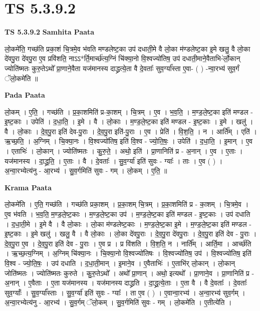 \documentclass[17pt]{extarticle}
\begin{document}
\section{ TS 5.3.9.2 }

\textbf{TS 5.3.9.2 } \newline
\textbf{Samhita Paata} \newline

लो॒कमे॑ति॒ गच्छ॑ति प्रका॒शं चि॒त्रमे॒व भ॑वति मण्डलेष्ट॒का उप॑ दधाती॒मे वै लो॒का म॑ण्डलेष्ट॒का इ॒मे खलु॒ वै लो॒का दे॑वपु॒रा दे॑वपु॒रा ए॒व प्रवि॑शति॒ नाऽऽ*र्ति॒मार्च्छ॑त्य॒ग्निं चि॑क्या॒नो वि॒श्वज्यो॑तिष॒ उप॑ दधाती॒माने॒वैताभि-॑र्लो॒कान् ज्योति॑ष्मतः कुरु॒तेऽथो᳚ प्रा॒णाने॒वैता यज॑मानस्य दाद्ध्रत्ये॒ता वै दे॒वताः᳚ सुव॒र्ग्या᳚स्ता ए॒वा- ( ) -न्वा॒रभ्य॑ सुव॒र्गं ॅलो॒कमे॑ति ॥ \newline

\textbf{Pada Paata} \newline

लो॒कम् । ए॒ति॒ । गच्छ॑ति । प्र॒का॒शमिति॑ प्र-का॒शम् । चि॒त्रम् । ए॒व । भ॒व॒ति॒ । म॒ण्ड॒ले॒ष्ट॒का इति॑ मण्डल - इ॒ष्ट॒काः । उपेति॑ । द॒धा॒ति॒ । इ॒मे । वै । लो॒काः । म॒ण्ड॒ले॒ष्ट॒का इति॑ मण्डल - इ॒ष्ट॒काः । इ॒मे । खलु॑ । वै । लो॒काः । दे॒व॒पु॒रा इति॑ देव-पु॒राः । दे॒व॒पु॒रा इति॑-पु॒राः । ए॒व । प्रेति॑ । वि॒श॒ति॒ । न । आर्ति᳚म् । एति॑ । ऋ॒च्छ॒ति॒ । अ॒ग्निम् । चि॒क्या॒नः । वि॒श्वज्यो॑तिष॒ इति॑ वि॒श्व - ज्यो॒ति॒षः॒ । उपेति॑ । द॒धा॒ति॒ । इ॒मान् । ए॒व । एताभिः॑ । लो॒कान् । ज्योति॑ष्मतः । कु॒रु॒ते॒ । अथो॒ इति॑ । प्रा॒णानिति॑ प्र - अ॒नान् । ए॒व । ए॒ताः । यज॑मानस्य । दा॒द्ध्र॒ति॒ । ए॒ताः । वै । दे॒वताः᳚ । सु॒व॒र्ग्या॑ इति॑ सुवः - ग्याः᳚ । ताः । ए॒व ( ) । अ॒न्वा॒रभ्येत्य॑नु - आ॒रभ्य॑ । सु॒व॒र्गमिति॑ सुवः - गम् । लो॒कम् । ए॒ति॒ ॥  \newline


\textbf{Krama Paata} \newline

लो॒कमे॑ति । ए॒ति॒ गच्छ॑ति । गच्छ॑ति प्रका॒शम् । प्र॒का॒शम् चि॒त्रम् । प्र॒का॒शमिति॑ प्र - का॒शम् । चि॒त्रमे॒व । ए॒व भ॑वति । भ॒व॒ति॒ म॒ण्ड॒ले॒ष्ट॒काः । म॒ण्ड॒ले॒ष्ट॒का उप॑ । म॒ण्ड॒ले॒ष्ट॒का इति॑ मण्डल - इ॒ष्ट॒काः । उप॑ दधाति । द॒धा॒ती॒मे । इ॒मे वै । वै लो॒काः । लो॒का म॑ण्डलेष्ट॒काः । म॒ण्ड॒ले॒ष्ट॒का इ॒मे । म॒ण्ड॒ले॒ष्ट॒का इति॑ मण्डल - इ॒ष्ट॒काः । इ॒मे खलु॑ । खलु॒ वै । वै लो॒काः । लो॒का दे॑वपु॒राः । दे॒व॒पु॒रा दे॑वपु॒राः । दे॒व॒पु॒रा इति॑ देव - पु॒राः । दे॒व॒पु॒रा ए॒व । दे॒व॒पु॒रा इति॑ देव - पु॒राः । ए॒व प्र । प्र वि॑शति । वि॒श॒ति॒ न । नार्ति᳚म् । आर्ति॒मा । आर्च्छ॑ति । ऋ॒च्छ॒त्य॒ग्निम् । अ॒ग्निम् चि॑क्या॒नः । चि॒क्या॒नो वि॒श्वज्यो॑तिषः । वि॒श्वज्यो॑तिष॒ उप॑ । वि॒श्वज्यो॑तिष॒ इति॑ वि॒श्व - ज्यो॒ति॒षः॒ । उप॑ दधाति । द॒धा॒ती॒मान् । इ॒माने॒व । ए॒वैताभिः॑ । ए॒ताभि॑र् लो॒कान् । लो॒कान् जोति॑ष्मतः । ज्योति॑ष्मतः कुरुते । कु॒रु॒तेऽथो᳚ । अथो᳚ प्रा॒णान् । अथो॒ इत्यथो᳚ । प्रा॒णाने॒व । प्रा॒णानिति॑ प्र - अ॒नान् । ए॒वैताः । ए॒ता यज॑मानस्य । यज॑मानस्य दाद्ध्रति । दा॒द्ध्र॒त्ये॒ताः । ए॒ता वै । वै दे॒वताः᳚ । दे॒वताः᳚ सुव॒र्ग्याः᳚ । सु॒व॒र्ग्या᳚स्ताः । सु॒व॒र्ग्या॑ इति॑ सुवः - ग्याः᳚ । ता ए॒व ( ) । ए॒वान्वा॒रभ्य॑ । अ॒न्वा॒रभ्य॑ सुव॒र्गम् । अ॒न्वा॒रभ्येत्य॑नु - आ॒रभ्य॑ । सु॒व॒र्गम् ॅलो॒कम् । सु॒व॒र्गमिति॑ सुवः - गम् । लो॒कमे॑ति । ए॒तीत्ये॑ति । \newline
\end{document}
